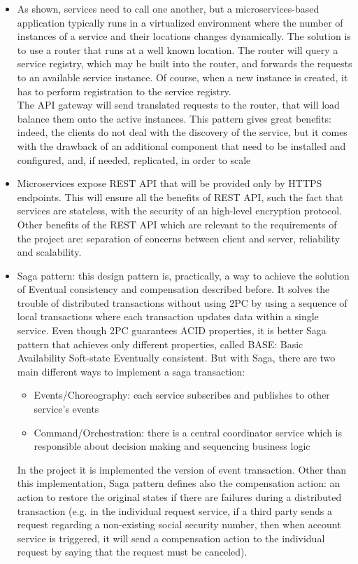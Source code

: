 \begin{itemize}
\item 
As shown, services need to call one another, but a microservices-based application typically runs in a virtualized 
environment where the number of instances of a service and their locations changes dynamically. 
The solution is to use a router that runs at a well known location. 
The router will query a service registry, which may be built into the
router, and forwards the requests to an available service instance.
Of course, when a new instance is created, it has to perform registration to the service registry. \\
The API gateway will send translated requests to the router, that will load balance them onto the active instances.
This pattern gives great benefits: indeed, the clients do not deal with the discovery of the service, but it comes with the drawback of
an additional component that need to be installed and configured, and, if needed, replicated, in order to scale
\item Microservices expose REST API that will be provided only by HTTPS endpoints. This will ensure
all the benefits of REST API, such the fact that services are stateless, with the security of an high-level encryption protocol. Other
benefits of the REST API which are relevant to the requirements of the project are: separation of concerns between client and server, reliability and scalability.
\item Saga pattern: this design pattern is, practically, a way to achieve the solution of Eventual consistency and compensation described before. It solves the trouble of distributed transactions without using 2PC by using a sequence of local transactions where each transaction updates data within a single service. Even though 2PC guarantees ACID properties, it is better Saga pattern that achieves only different properties, called BASE: Basic Availability Soft-state Eventually consistent.  But with Saga, there are two main different ways to implement a saga transaction:
\begin{itemize}
\item Events/Choreography: each service subscribes and publishes to other service's events
\item Command/Orchestration: there is a central coordinator service which is responsible about decision making and sequencing business logic 
\end{itemize}
In the project it is implemented the version of event transaction. Other than this implementation, Saga pattern defines also 
the compensation action: an action to restore the original states if there are failures during a distributed transaction (e.g. in 
the individual request service, if a third party sends a request regarding a non-existing social security number, then when 
account service is triggered, it will send a compensation action to the individual request by saying that the request must be canceled).

\end{itemize}